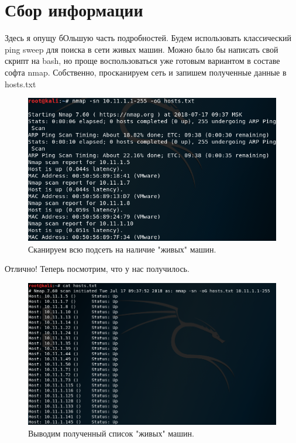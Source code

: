 \documentclass[a4paper,12pt]{article}
\begin{document}
\section{Сбор информации}
Здесь я опущу бОльшую часть подробностей. Будем использовать классический ping sweep для поиска в сети живых машин. Можно было бы написать свой скрипт на bash, но проще воспользоваться уже готовым вариантом в составе софта nmap. Собственно, просканируем сеть и запишем полученные данные в hosts.txt
\begin{figure}[h!]
	\includegraphics[width=\linewidth]{nmap_start_1.png}
	\caption{Сканируем всю подсеть на наличие "живых" машин.}
	\label{fig:boat1}
\end{figure}

Отлично! Теперь посмотрим, что у нас получилось. 
\newpage
\begin{figure}[h!]
	\includegraphics[width=\linewidth]{cat_hosts_2.png}
	\caption{Выводим полученный список "живых" машин.}
	\label{fig:boat2}
\end{figure}
\end{document}
